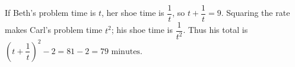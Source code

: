 If Beth's problem time is $t$, her shoe time is $\dfrac{1}{t}$, so $t+\dfrac{1}{t}=9$. Squaring the rate makes Carl's problem time $t^2$; his shoe time is $\dfrac{1}{t^2}$. Thus his total is $(t+\dfrac{1}{t})^2-2=81-2=\boxed{79\text{ minutes}}$.
